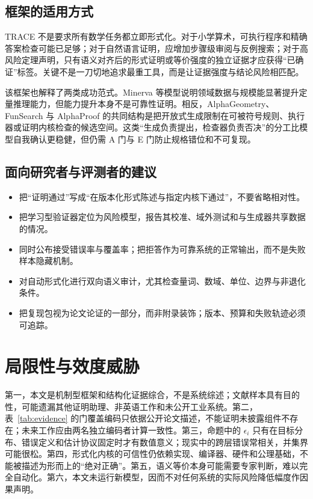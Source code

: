 \documentclass[UTF8,11pt,a4paper,fontset=fandol]{ctexart}
\newcommand{\trace}{\textsf{TRACE}}
\begin{document}
\subsection{框架的适用方式}
\trace{} 不是要求所有数学任务都立即形式化。对于小学算术，可执行程序和精确答案检查可能已足够；对于自然语言证明，应增加步骤级审阅与反例搜索；对于高风险定理声明，只有语义对齐后的形式证明或等价强度的独立证据才应获得“已确证”标签。关键不是一刀切地追求最重工具，而是让证据强度与结论风险相匹配。

该框架也解释了两类成功范式。Minerva 等模型说明领域数据与规模能显著提升定量推理能力\cite{lewkowycz2022minerva}，但能力提升本身不是可靠性证明。相反，AlphaGeometry、FunSearch 与 AlphaProof 的共同结构是把开放式生成限制在可被符号规则、执行器或证明内核检查的候选空间\cite{trinh2024alphageometry,romeraparedes2024funsearch,hubert2026alphaproof}。这类“生成负责提出，检查器负责否决”的分工比模型自我确认更稳健，但仍需 A 门与 E 门防止规格错位和不可复现。

\subsection{面向研究者与评测者的建议}
\begin{itemize}
  \item 把“证明通过”写成“在版本化形式陈述与指定内核下通过”，不要省略相对性。
  \item 把学习型验证器定位为风险模型，报告其校准、域外测试和与生成器共享数据的情况。
  \item 同时公布接受错误率与覆盖率；把拒答作为可靠系统的正常输出，而不是失败样本隐藏机制。
  \item 对自动形式化进行双向语义审计，尤其检查量词、数域、单位、边界与非退化条件。
  \item 把复现包视为论文论证的一部分，而非附录装饰；版本、预算和失败轨迹必须可追踪。
\end{itemize}

\section{局限性与效度威胁}
第一，本文是机制型框架和结构化证据综合，不是系统综述；文献样本具有目的性，可能遗漏其他证明助理、非英语工作和未公开工业系统。第二，表~\ref{tab:evidence} 的门覆盖编码只依据公开论文描述，不能证明未披露组件不存在；未来工作应由两名独立编码者计算一致性。第三，命题中的 $\epsilon_i$ 只有在目标分布、错误定义和估计协议固定时才有数值意义；现实中的跨层错误常相关，并集界可能很松。第四，形式化内核的可信性仍依赖实现、编译器、硬件和公理基础，不能被描述为形而上的“绝对正确”。第五，语义等价本身可能需要专家判断，难以完全自动化。第六，本文未运行新模型，因而不对任何系统的实际风险降低幅度作因果声明。
\end{document}
